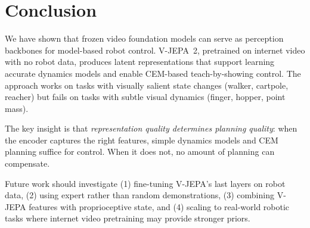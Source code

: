 \documentclass{article}
\begin{document}
\section{Conclusion}

We have shown that frozen video foundation models can serve as perception backbones for model-based robot control. V-JEPA~2, pretrained on internet video with no robot data, produces latent representations that support learning accurate dynamics models and enable CEM-based teach-by-showing control. The approach works on tasks with visually salient state changes (walker, cartpole, reacher) but fails on tasks with subtle visual dynamics (finger, hopper, point mass).

The key insight is that \emph{representation quality determines planning quality}: when the encoder captures the right features, simple dynamics models and CEM planning suffice for control. When it does not, no amount of planning can compensate.

Future work should investigate (1) fine-tuning V-JEPA's last layers on robot data, (2) using expert rather than random demonstrations, (3) combining V-JEPA features with proprioceptive state, and (4) scaling to real-world robotic tasks where internet video pretraining may provide stronger priors.



\end{document}
